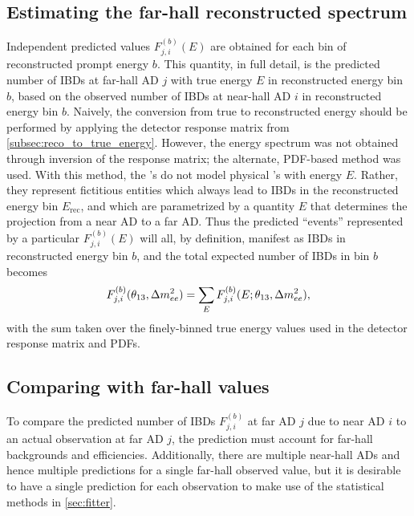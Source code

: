 \subsection{Estimating the far-hall reconstructed spectrum}
\label{subsec:true_to_reco_farhall}

Independent predicted values $F_{j,i}^{(b)}(E)$ are obtained
for each bin of reconstructed prompt energy $b$.
This quantity, in full detail,
is the predicted number of IBDs at far-hall AD $j$
with true \nuebar{} energy $E$ in reconstructed energy bin $b$,
based on the observed number of IBDs at near-hall AD $i$
in reconstructed energy bin $b$.
Naively, the conversion from true to reconstructed energy
should be performed by applying the detector response matrix
from \cref{subsec:reco_to_true_energy}.
However, the \nuebar{} energy spectrum was not obtained
through inversion of the response matrix;
the alternate, PDF-based method was used.
With this method, the \nuebar{}'s do not model physical \nuebar{}'s with energy $E$.
Rather, they represent fictitious entities which always
lead to IBDs in the reconstructed energy bin $E_\text{rec}$,
and which are parametrized by a quantity $E$ that determines
the projection from a near AD to a far AD.
Thus the predicted ``events'' represented by a particular
$F_{j,i}^{(b)}(E)$ will all, by definition,
manifest as IBDs in reconstructed energy bin $b$,
and the total expected number of IBDs in bin $b$ becomes
\begin{equation}
    F_{j,i}^{(b)}(\theta_{13},\Delta m^2_{ee}) = \sum_E F_{j,i}^{(b)}(E;\theta_{13},\Delta m^2_{ee}),
\end{equation}
with the sum taken over the finely-binned true energy values
used in the detector response matrix and PDFs.

\subsection{Comparing with far-hall values}
\label{subsec:far_bg_eff}

To compare the predicted number of IBDs $F_{j,i}^{(b)}$
at far AD $j$ due to near AD $i$
to an actual observation at far AD $j$,
the prediction must account for far-hall backgrounds and efficiencies.
Additionally, there are multiple near-hall ADs
and hence multiple predictions for a single far-hall observed value,
but it is desirable to have a single prediction for each observation
to make use of the statistical methods in \cref{sec:fitter}.

